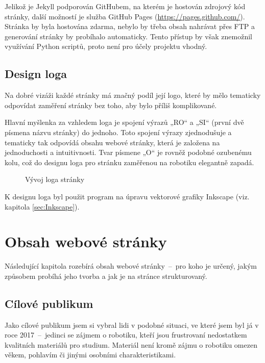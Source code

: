 \documentclass[a4paper, 12pt]{article}
\begin{document}
  Jelikož je Jekyll podporován GitHubem, na kterém je hostován zdrojový kód stránky, další možností je služba GitHub Pages (\url{https://pages.github.com/}). Stránka by byla hostována zdarma, nebylo by třeba obsah nahrávat přes FTP a generování stránky by probíhalo automaticky. Tento přístup by však znemožnil využívání Python scriptů, proto není pro účely projektu vhodný.


  \subsection{Design loga}
  Na dobré vizáži každé stránky má značný podíl její logo, které by mělo tematicky odpovídat zaměření stránky bez toho, aby bylo příliš komplikované.

  Hlavní myšlenka za vzhledem loga je spojení výrazů „RO“ a „SI“ (první dvě písmena názvu stránky) do jednoho. Toto spojení výrazy zjednodušuje a tematicky tak odpovídá obsahu webové stránky, která je založena na jednoduchosti a intuitivnosti. Tvar písmene „O“ je rovněž podobné ozubenému kolu, což do designu loga pro stránku zaměřenou na robotiku elegantně zapadá.

  \begin{figure}[H]%
    \centering

    \hfill
    \hfill

    \caption{Vývoj loga stránky}%
    \label{img:Vývoj loga stránky}%
  \end{figure}

  K designu loga byl použit program na úpravu vektorové grafiky Inkscape (viz. kapitola \ref{sec:Inkscape}).


  \section{Obsah webové stránky}
  Následující kapitola rozebírá obsah webové stránky~--~pro koho je určený, jakým způsobem probíhá jeho tvorba a jak je na stránce strukturovaný.


  \subsection{Cílové publikum}
  Jako cílové publikum jsem si vybral lidi v podobné situaci, ve které jsem byl já v roce 2017~--~jedinci se zájmem o robotiku, kteří jsou frustrovaní nedostatkem kvalitních materiálů pro studium. Materiál není kromě zájmu o robotiku omezen věkem, pohlavím či jinými osobními charakteristikami.
\end{document}
